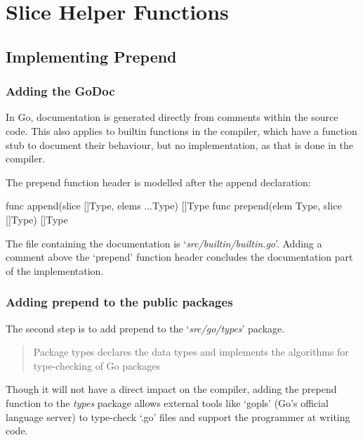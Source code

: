 
\section{Slice Helper Functions}
\subsection{Implementing Prepend}

\subsubsection{Adding the GoDoc}
In Go, documentation is generated directly from comments within the source code\cite{godoc}. This also applies to
builtin functions in the compiler, which have a function stub to document their behaviour\cite{godoc-builtin},
but no implementation, as that is done in the compiler\cite{builtin-impl}.

The prepend function header is modelled after the append declaration:
\begin{code}
\begin{gocode}
func append(slice []Type, elems ...Type) []Type
func prepend(elem Type, slice []Type) []Type
\end{gocode}
\end{code}

The file containing the documentation is `\textit{src/builtin/builtin.go}'.
Adding a comment above the `prepend' function header concludes the documentation
part of the implementation.

\subsubsection{Adding prepend to the public packages}

The second step is to add prepend to the `\textit{src/go/types}' package.
\begin{quote}
    Package types declares the data types and implements the algorithms for
    type-checking of Go packages
\end{quote}\cite{godoc-types}

Though it will not have a direct impact on the compiler, adding the prepend function
to the \textit{types} package allows external tools like `gopls' (Go's official language
server)\cite{gopls} to type-check `.go' files and support the programmer
at writing code.

